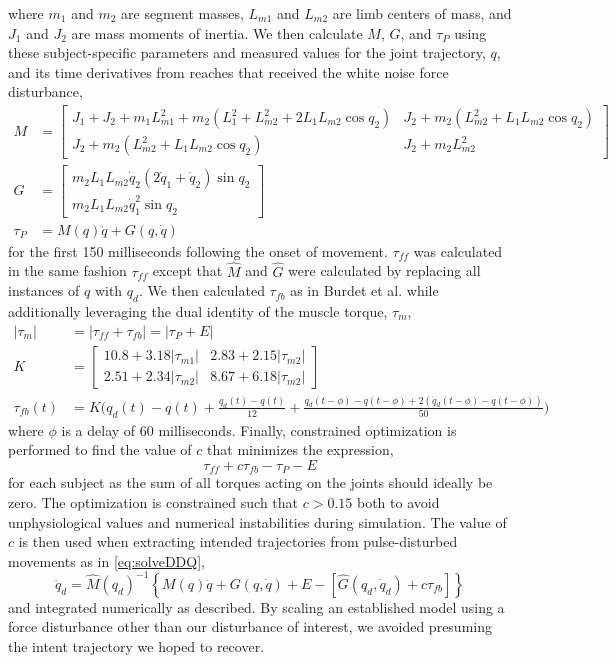 where $m_1$ and $m_2$ are segment masses, $L_{m1}$ and $L_{m2}$ are limb centers of mass, and $J_1$ and $J_2$ are mass moments of inertia. We then calculate $M$, $G$, and $\tau_P$ using these subject-specific parameters and measured values for the joint trajectory, $q$, and its time derivatives from reaches that received the white noise force disturbance,
\begin{align}
M&=\begin{bmatrix}J_1+J_2+m_1 L_{m1}^2+m_2(L_1^2+L_{m2}^2+2 L_1 L_{m2} \cos{q_2}) & J_2+m_2(L_{m2}^2+L_1 L_{m2} \cos{q_2}) \\
J_2+m_2(L_{m2}^2+L_1 L_{m2} \cos{q_2}) & J_2+m_2L_{m2}^2
\end{bmatrix} \\
G&=\begin{bmatrix}
m_2 L_1 L_{m2} \dot{q}_2(2\dot{q}_1+\dot{q}_2)\sin{q_2} \\
m_2 L_1 L_{m2} \dot{q}_1^2\sin{q_2}
\end{bmatrix} \\
\tau_P&=M(q)\ddot{q}+G(q,\dot{q})
\end{align}
for the first 150 milliseconds following the onset of movement. $\tau_{ff}$ was calculated in the same fashion $\tau_{ff}$ except that $\hat{M}$ and $\hat{G}$ were calculated by replacing all instances of $q$ with $q_d$. We then calculated $\tau_{fb}$ as in Burdet et al.\cite{burdet2006stability} while additionally leveraging the dual identity of the muscle torque, $\tau_m$,
\begin{align}
|\tau_m|&=|\tau_{ff}+\tau_{fb}|=|\tau_P+E| \\
K&=\begin{bmatrix}
10.8+3.18|\tau_{m1}| & 2.83+2.15|\tau_{m2}| \\
2.51+2.34|\tau_{m2}| & 8.67+6.18|\tau_{m2}|
\end{bmatrix}\\
\tau_{fb}(t)&=K\big(q_d(t)-q(t)+\frac{\dot{q}_d(t)-q(t)}{12}+\frac{q_d(t-\phi)-q(t-\phi)+2(\dot{q}_d(t-\phi)-q(t-\phi))}{50}\big)
\end{align}
where $\phi$ is a delay of 60 milliseconds. Finally, constrained optimization is performed to find the value of $c$ that minimizes the expression,
\begin{equation}
\tau_{ff}+c\tau_{fb}-\tau_P-E
\end{equation}
for each subject as the sum of all torques acting on the joints should ideally be zero. The optimization is constrained such that $c>0.15$ both to avoid unphysiological values and numerical instabilities during simulation. The value of $c$ is then used when extracting intended trajectories from pulse-disturbed movements as in \eqref{eq:solveDDQ},
\begin{equation}
\ddot{q}_d=\hat{M}(q_d)^{-1}\left\{M(q)\ddot{q}+G(q,\dot{q})+E-[\hat{G}(q_d,\dot{q}_d)+c\tau_{fb}]\right\}
\end{equation}
and integrated numerically as described. By scaling an established model using a force disturbance other than our disturbance of interest, we avoided presuming the intent trajectory we hoped to recover.


